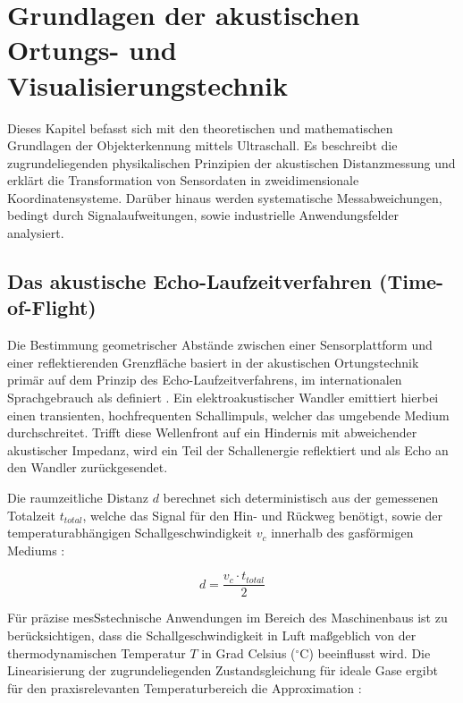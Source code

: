 %
%
%


\chapter{Grundlagen der akustischen Ortungs- und Visualisierungstechnik}
\label{chap:Domain_Knowledge_Application}

Dieses Kapitel befasst sich mit den theoretischen und mathematischen Grundlagen der Objekterkennung mittels Ultraschall. Es beschreibt die zugrundeliegenden physikalischen Prinzipien der akustischen Distanzmessung und erklärt die Transformation von Sensordaten in zweidimensionale Koordinatensysteme. Darüber hinaus werden systematische Messabweichungen, bedingt durch Signalaufweitungen, sowie industrielle Anwendungsfelder analysiert.

\section{Das akustische Echo-Laufzeitverfahren (Time-of-Flight)}
\label{sec:Time_of_Flight_Theorie}

Die Bestimmung geometrischer Abstände zwischen einer Sensorplattform und einer reflektierenden Grenzfläche basiert in der akustischen Ortungstechnik primär auf dem Prinzip des Echo-Laufzeitverfahrens, im internationalen Sprachgebrauch als  definiert \cite{Lerch:2012}. Ein elektroakustischer Wandler emittiert hierbei einen transienten, hochfrequenten Schallimpuls, welcher das umgebende Medium durchschreitet. Trifft diese Wellenfront auf ein Hindernis mit abweichender akustischer Impedanz, wird ein Teil der Schallenergie reflektiert und als Echo an den Wandler zurückgesendet.

Die raumzeitliche Distanz $d$ berechnet sich deterministisch aus der gemessenen Totalzeit $t_{total}$, welche das Signal für den Hin- und Rückweg benötigt, sowie der temperaturabhängigen Schallgeschwindigkeit $v_c$ innerhalb des gasförmigen Mediums \cite{Fraden:2010}:

\begin{equation}
	d = \frac{v_c \cdot t_{total}}{2}
\end{equation}

Für präzise mesSstechnische Anwendungen im Bereich des Maschinenbaus ist zu berücksichtigen, dass die Schallgeschwindigkeit in Luft ma\ss geblich von der thermodynamischen Temperatur $T$ in Grad Celsius ($^\circ$C) beeinflusst wird. Die Linearisierung der zugrundeliegenden Zustandsgleichung für ideale Gase ergibt für den praxisrelevanten Temperaturbereich die Approximation \cite{Lerch:2012}:

